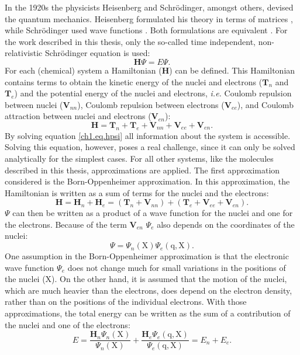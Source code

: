 In the 1920s the physicists Heisenberg and Schr\"{o}dinger, amongst others, devised the quantum mechanics. Heisenberg formulated his theory in terms of matrices \cite{heisenberg}, while Schr\"{o}dinger used wave functions \cite{schrodinger1,schrodinger2}. Both formulations are equivalent \cite{schrodinger3}. For the work described in this thesis, only the so-called time independent, non-relativistic Schr\"{o}dinger equation is used:
\begin{equation}
\mathbf{H} \Psi=E \Psi.
\label{ch1.eq.hpsi}
\end{equation}
For each (chemical) system a Hamiltonian ($\mathbf{H}$) can be defined. This Hamiltonian contains terms to obtain the kinetic energy of the nuclei and electrons ($\mathbf{T}_n$ and $\mathbf{T}_e$) and the potential energy of the nuclei and electrons, \textit{i.e.} Coulomb repulsion between nuclei ($\mathbf{V}_{nn}$), Coulomb repulsion between electrons ($\mathbf{V}_{ee}$), and Coulomb attraction between nuclei and electrons ($\mathbf{V}_{en}$):
\begin{equation}
\mathbf{H} = \mathbf{T}_n + \mathbf{T}_e + \mathbf{V}_{nn} + \mathbf{V}_{ee} + \mathbf{V}_{en}.
\label{ch1.eq.htotal}
\end{equation}
By solving equation \ref{ch1.eq.hpsi} all information about the system is accessible. Solving this equation, however, poses a real challenge, since it can only be solved analytically for the simplest cases. For all other systems, like the molecules described in this thesis, approximations are applied. The first approximation considered is the Born-Oppenheimer approximation\cite{born}. In this approximation, the Hamiltonian is written as a sum of terms for the nuclei and the electrons:
\begin{equation}
\mathbf{H} = \mathbf{H}_n + \mathbf{H}_e = (\mathbf{T}_n + \mathbf{V}_{nn}) + (\mathbf{T}_e + \mathbf{V}_{ee} + \mathbf{V}_{en}).
\label{ch1.eq.hsplit}
\end{equation}
$\Psi$ can then be written as a product of a wave function for the nuclei and one for the electrons. Because of the term $\mathbf{V}_{en}$ $\Psi_{e}$ also depends on the coordinates of the nuclei:
\begin{equation}
\Psi = \Psi_{n}(\mathrm{X}) \Psi_{e}(\mathrm{q,X}).
\end{equation}
One assumption in the Born-Oppenheimer approximation is that the electronic wave function $\Psi_{e}$ does not change much for small variations in the positions of the nuclei ($\mathrm{X}$). On the other hand, it is assumed that the motion of the nuclei, which are much heavier than the electrons, does depend on the electron density, rather than on the positions of the individual electrons. With those approximations, the total energy can be written as the sum of a contribution of the nuclei and one of the electrons:
\begin{equation}
E = \frac{\mathbf{H}_n \Psi_n(\mathrm{X})}{\Psi_n(\mathrm{X})} + \frac{\mathbf{H}_e \Psi_e(\mathrm{q,X})}{\Psi_e(\mathrm{q,X})} = E_{n} + E_{e}.
\end{equation}

